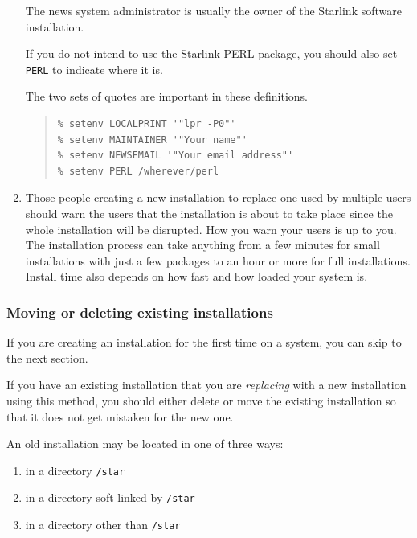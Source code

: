 \documentclass[twoside,11pt]{article}
\newcommand{\xlabel}[1]{}
\renewcommand{\_}{\texttt{\symbol{95}}}
\begin{document}
\begin{enumerate}
The news system administrator is usually the owner of the Starlink software
installation.

If you do not intend to use the Starlink PERL package, you should also
set \texttt{PERL} to indicate where it is.

The two sets of quotes are important in these definitions.

\begin{quote}
\begin{verbatim}
% setenv LOCALPRINT '"lpr -P0"'
% setenv MAINTAINER '"Your name"'
% setenv NEWSEMAIL '"Your email address"'
% setenv PERL /wherever/perl
\end{verbatim}
\end{quote}

\item Those people creating a new installation to replace one used by
multiple users should warn the users that the installation is about to take
place since the whole installation will be disrupted.
How you warn your users is up to you.  The installation process can take
anything from a few minutes for small installations with just a few
packages to an hour or more for full installations.  Install time also
depends on how fast and how loaded your system is.

\end{enumerate}

\subsubsection{\xlabel{moving_or_deleting_existing_installations}Moving or deleting existing installations}
\label{moving_or_deleting_existing_installations}

If you are creating an installation for the first time on a system,
you can skip to the next section.

If you have an existing installation that you are \textit{replacing}
with a new installation using this method, you should either delete or
move the existing installation so that it does not get mistaken for the
new one.

An old installation may be located in one of three ways:

\begin{enumerate}
\item in a directory \texttt{/star}
\item in a directory soft linked by \texttt{/star}
\item in a directory other than \texttt{/star}
\end{enumerate}
\end{document}
